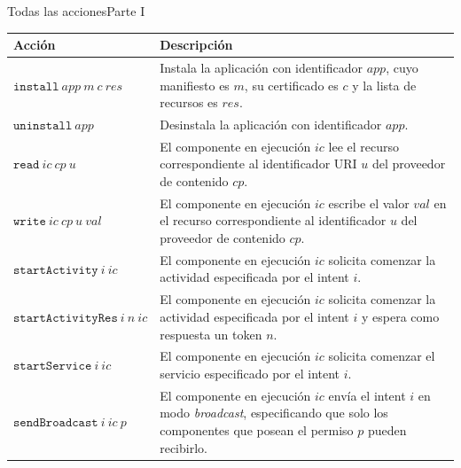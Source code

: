 \documentclass[pdf]{beamer} %
\begin{document}
\begin{frame}{Todas las acciones}{Parte I}
    \fontsize{8pt}{9pt}\selectfont
    \begin{table}
        \begin{tabularx}{\linewidth}{|l X|}
            \hline
            \textbf{Acción}                    & \textbf{Descripción}                                                                                                                                               \\
            \hline
            $\mathtt{install}~app~m~c~res$     & Instala la aplicación con identificador $app$, cuyo manifiesto es $m$, su certificado es $c$ y la lista de recursos es $res$.                                      \\
            \hline
            $\mathtt{uninstall}~app$           & Desinstala la aplicación con identificador $app$.                                                                                                                  \\
            \hline
            $\mathtt{read}~ic~cp~u$            & El componente en ejecución $ic$ lee el recurso correspondiente al identificador URI $u$ del proveedor de contenido $cp$.                                           \\
            \hline
            $\mathtt{write}~ic~cp~u~val$       & El componente en ejecución $ic$ escribe el valor $val$ en el recurso correspondiente al identificador $u$ del proveedor de contenido $cp$.                         \\
            \hline
            $\mathtt{startActivity}~i~ic$      & El componente en ejecución $ic$ solicita comenzar la actividad especificada por el intent $i$.                                                                     \\
            \hline
            $\mathtt{startActivityRes}~i~n~ic$ & El componente en ejecución $ic$ solicita comenzar la actividad especificada por el intent $i$ y espera como respuesta un token $n$.                                \\
            \hline
            $\mathtt{startService}~i~ic$       & El componente en ejecución $ic$ solicita comenzar el servicio especificado por el intent $i$.                                                                      \\
            \hline
            $\mathtt{sendBroadcast}~i~ic~p$    & El componente en ejecución $ic$ envía el intent $i$ en modo \textit{broadcast}, especificando que solo los componentes que posean el permiso $p$ pueden recibirlo. \\
            \hline
        \end{tabularx}
    \end{table}
\end{frame}
\end{document}
